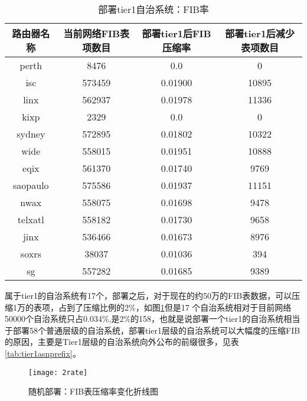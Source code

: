 \begin{table}[h]
    \centering
    \caption{部署tier1自治系统：FIB率}
    \label{tab:tieronefibdatarate}
    \begin{tabular}{|c|c|c|c|}
    \hline
            路由器名称 & 当前网络FIB表项数目 & 部署tier1后FIB压缩率 & 部署tier1后减少表项数目\\ \hline
            perth    & 8476   & 0.0   & 0  \\ \hline
            isc      & 573459 & 0.01900 & 10895   \\ \hline
            linx     & 562937 & 0.01978  & 11336   \\ \hline
            kixp     & 2329   & 0.0   & 0        \\ \hline
            sydney   & 572895 & 0.01802 & 10322      \\ \hline
            wide     & 558015 & 0.01951 &  10888         \\ \hline
            eqix     & 561370 & 0.01740 & 9769        \\ \hline
            saopaulo & 575586 & 0.01937 & 11151       \\ \hline
            nwax     & 558075 & 0.01698  &     9478     \\ \hline
            telxatl  & 558182 & 0.01730  &  9658      \\ \hline
            jinx     & 536466 &   0.01673   &     8976    \\ \hline
            soxrs    & 38037  & 0.01036     &  394   \\ \hline
            sg       & 557282 & 0.01685    & 9389\\ \hline
    \end{tabular}
\end{table}

属于tier1的自治系统有17个，部署之后，对于现在的约50万的FIB表数据，可以压缩1万的表项，占到了压缩比例的2\%，如图\ref{tab:tieronefibdatarate}但是17 个自治系统相对于目前网络50000个自治系统只占0.034\%,是2\%的1\/58，也就是说部署一个tier1的自治系统相当于部署58个普通层级的自治系统，部署tier1层级的自治系统可以大幅度的压缩FIB的原因，主要是Tier1层级的自治系统向外公布的前缀很多，见表\ref{tab:tier1asnprefix}。

\begin{figure}
  \centering
  \texttt{[image: 2rate]}
  \caption{随机部署：FIB表压缩率变化折线图}
  \label{fig:2rate}
\end{figure}

